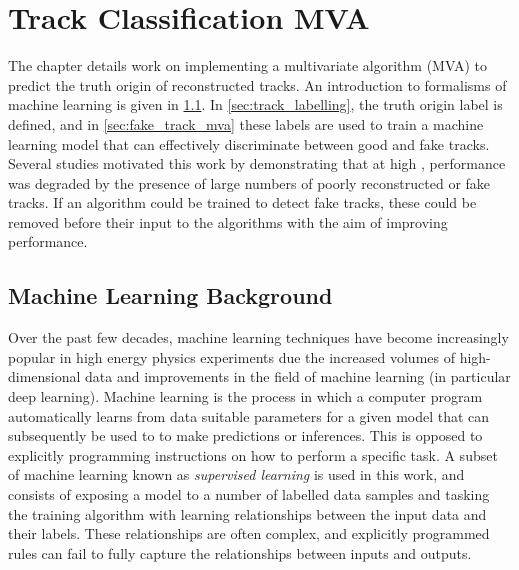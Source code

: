 \chapter{Track Classification MVA}\label{chap:track_classification_mva}

The chapter details work on implementing a multivariate algorithm (MVA) to predict the truth origin of reconstructed tracks.
An introduction to formalisms of machine learning is given in \cref{sec:ml_background}.
In \cref{sec:track_labelling}, the truth origin label is defined, and in \cref{sec:fake_track_mva} these labels are used to train a machine learning model that can effectively discriminate between good and fake tracks.
Several studies motivated this work by demonstrating that at high \pt, \btagging performance was degraded by the presence of large numbers of poorly reconstructed or fake tracks.
If an algorithm could be trained to detect fake tracks, these could be removed before their input to the \btagging algorithms with the aim of improving performance.


\section{Machine Learning Background}\label{sec:ml_background}

Over the past few decades, machine learning techniques have become increasingly popular in high energy physics experiments due the increased volumes of high-dimensional data and improvements in the field of machine learning (in particular deep learning).
Machine learning is the process in which a computer program automatically learns from data suitable parameters for a given model that can subsequently be used to to make predictions or inferences.
This is opposed to explicitly programming instructions on how to perform a specific task.
A subset of machine learning known as \textit{supervised learning} is used in this work, and consists of exposing a model to a number of labelled data samples and tasking the training algorithm with learning relationships between the input data and their labels.
These relationships are often complex, and explicitly programmed rules can fail to fully capture the relationships between inputs and outputs.


